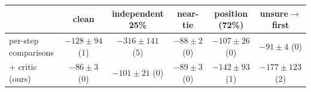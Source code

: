 \begin{tabular}{lccccc}
\toprule
 & clean & independent 25\% & near-tie & position (72\%) & unsure$\to$first \\
\midrule
per-step comparisons & $-128\pm94$ (1) & $-316\pm141$ (5) & $-88\pm2$ (0) & $-107\pm26$ (0) & $-91\pm4$ (0) \\
+ critic (ours) & $-86\pm3$ (0) & $-101\pm21$ (0) & $-89\pm3$ (0) & $-142\pm93$ (1) & $-177\pm123$ (2) \\
\bottomrule
\end{tabular}
